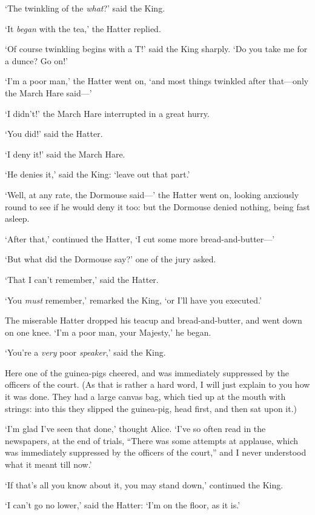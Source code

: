\documentclass[12pt,openany]{memoir}
\begin{document}
`The twinkling of the \textit{what}?' said the King.

`It \textit{began} with the tea,' the Hatter replied.

`Of course twinkling begins with a T!' said the King sharply. `Do you take me for a dunce? Go on!'

`I'm a poor man,' the Hatter went on, `and most things twinkled after that---only the March Hare said---'

`I didn't!' the March Hare interrupted in a great hurry.

`You did!' said the Hatter.

`I deny it!' said the March Hare.

`He denies it,' said the King: `leave out that part.'

`Well, at any rate, the Dormouse said---' the Hatter went on, looking anxiously round to see if he would deny it too: but the Dormouse denied nothing, being fast asleep.

`After that,' continued the Hatter, `I cut some more bread-and-butter---'

`But what did the Dormouse say?' one of the jury asked.

`That I can't remember,' said the Hatter.

`You \textit{must} remember,' remarked the King, `or I'll have you executed.'

The miserable Hatter dropped his teacup and bread-and-butter, and went down on one knee. `I'm a poor man, your Majesty,' he began.

`You're a \textit{very} poor \textit{speaker},' said the King.

Here one of the guinea-pigs cheered, and was immediately suppressed by the officers of the court. (As that is rather a hard word, I will just explain to you how it was done. They had a large canvas bag, which tied up at the mouth with strings: into this they slipped the guinea-pig, head first, and then sat upon it.)

`I'm glad I've seen that done,' thought Alice. `I've so often read in the newspapers, at the end of trials, ``There was some attempts at applause, which was immediately suppressed by the officers of the court,'' and I never understood what it meant till now.'

`If that's all you know about it, you may stand down,' continued the King.

`I can't go no lower,' said the Hatter: `I'm on the floor, as it is.'
\end{document}
